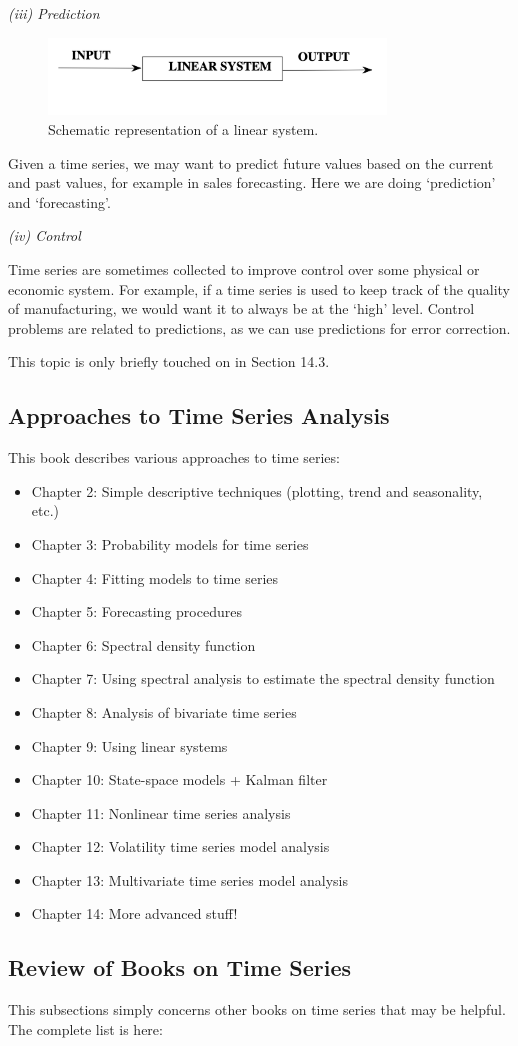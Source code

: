 \textit{(iii) Prediction}

\begin{figure}[h]
	\centering
	\includegraphics[width=0.8\textwidth]{Chapter 1/fig1-9.png}
	\caption{Schematic representation of a linear system.}
	\label{fig:1.9}
\end{figure}

Given a time series, we may want to predict future values based on the current and past values, for example in sales forecasting. Here we are doing `prediction' and `forecasting'.

\textit{(iv) Control}

Time series are sometimes collected to improve control over some physical or economic system. For example, if a time series is used to keep track of the quality of manufacturing, we would want it to always be at the `high' level. Control problems are related to predictions, as we can use predictions for error correction.

This topic is only briefly touched on in Section 14.3.



\subsection{Approaches to Time Series Analysis}
This book describes various approaches to time series: 
\begin{itemize}
	\item Chapter 2: Simple descriptive techniques (plotting, trend and seasonality, etc.)
	\item Chapter 3: Probability models for time series
	\item Chapter 4: Fitting models to time series
	\item Chapter 5: Forecasting procedures
	\item Chapter 6: Spectral density function
	\item Chapter 7: Using spectral analysis to estimate the spectral density function
	\item Chapter 8: Analysis of bivariate time series
	\item Chapter 9: Using linear systems 
	\item Chapter 10: State-space models + Kalman filter
	\item Chapter 11: Nonlinear time series analysis
	\item Chapter 12: Volatility time series model analysis
	\item Chapter 13: Multivariate time series model analysis
	\item Chapter 14: More advanced stuff!
\end{itemize}



\subsection{Review of Books on Time Series}
This subsections simply concerns other books on time series that may be helpful. The complete list is here:


